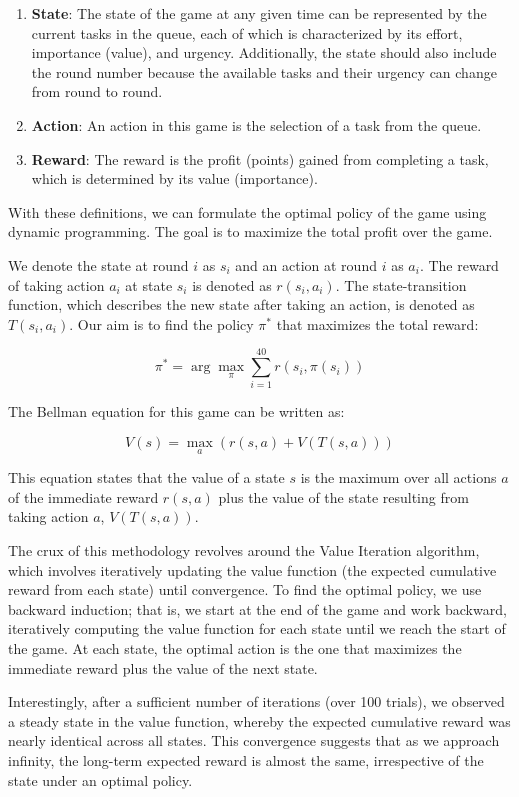 \documentclass[
]{report}
\begin{document}
\begin{enumerate}
\def\labelenumi{\arabic{enumi}.}
\item
  \textbf{State}: The state of the game at any given time can be
  represented by the current tasks in the queue, each of which is
  characterized by its effort, importance (value), and urgency.
  Additionally, the state should also include the round number because
  the available tasks and their urgency can change from round to round.
\item
  \textbf{Action}: An action in this game is the selection of a task
  from the queue.
\item
  \textbf{Reward}: The reward is the profit (points) gained from
  completing a task, which is determined by its value (importance).
\end{enumerate}

With these definitions, we can formulate the optimal policy of the game
using dynamic programming. The goal is to maximize the total profit over
the game.

We denote the state at round \(i\) as \(s_i\) and an action at round
\(i\) as \(a_i\). The reward of taking action \(a_i\) at state \(s_i\)
is denoted as \(r(s_i, a_i)\). The state-transition function, which
describes the new state after taking an action, is denoted as
\(T(s_i, a_i)\). Our aim is to find the policy \(\pi^*\) that maximizes
the total reward:

\[
 \pi^* = \arg\max_{\pi} \sum_{i=1}^{40} r(s_i, \pi(s_i))
\]

The Bellman equation for this game can be written as:

\[
V(s) = \max_{a} \left( r(s, a) + V(T(s, a)) \right)
\]

This equation states that the value of a state \(s\) is the maximum over
all actions \(a\) of the immediate reward \(r(s, a)\) plus the value of
the state resulting from taking action \(a\), \(V(T(s, a))\).

The crux of this methodology revolves around the Value Iteration
algorithm, which involves iteratively updating the value function (the
expected cumulative reward from each state) until convergence. To find
the optimal policy, we use backward induction; that is, we start at the
end of the game and work backward, iteratively computing the value
function for each state until we reach the start of the game. At each
state, the optimal action is the one that maximizes the immediate reward
plus the value of the next state.

Interestingly, after a sufficient number of iterations (over 100
trials), we observed a steady state in the value function, whereby the
expected cumulative reward was nearly identical across all states. This
convergence suggests that as we approach infinity, the long-term
expected reward is almost the same, irrespective of the state under an
optimal policy.
\end{document}

